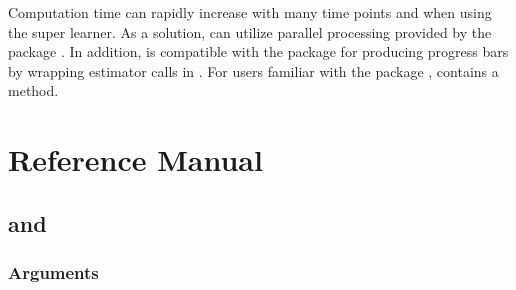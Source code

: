 \documentclass[]{jss}
\begin{document}
Computation time can rapidly increase with many time points and when using the super learner. As a solution,  
can utilize parallel processing provided by the  package \citep{future}. In addition, 
 is compatible with the  package \citep{progressr} for producing progress bars by wrapping estimator calls in
. For users familiar with the  package \citep{broom},  contains a  method. 

\hypertarget{reference-manual}{%
\section{Reference Manual}\label{reference-manual}}

\subsection[lmtp_tmle and lmtp_sdr]{ and }

\subsubsection{Arguments}
\end{document}
